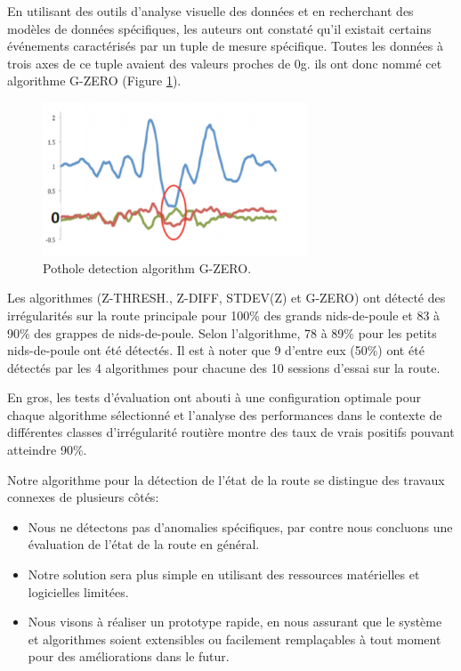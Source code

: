 En utilisant des outils d'analyse visuelle des données et en recherchant des modèles de données spécifiques, les auteurs ont constaté qu'il existait certains événements caractérisés par un tuple de mesure spécifique. Toutes les données à trois axes de ce tuple avaient des valeurs proches de 0g. ils ont donc nommé cet algorithme G-ZERO (Figure \ref{fig:graph_g_zero}).

\begin{figure}[h!]
  \center
  \includegraphics[width=0.7\textwidth]{Images/chapter2/relatedWork6.PNG}
  \caption{Pothole detection algorithm G-ZERO.}
  \label{fig:graph_g_zero}
\end{figure}

\bigbreak
Les algorithmes (Z-THRESH., Z-DIFF, STDEV(Z) et G-ZERO) ont détecté des irrégularités sur la route principale pour 100\% des grands nids-de-poule et 83 à 90\% des grappes de nids-de-poule. Selon l'algorithme, 78 à 89\% pour les petits nids-de-poule ont été détectés. Il est à noter que 9 d'entre eux (50\%) ont été détectés par les 4 algorithmes pour chacune des 10 sessions d'essai sur la route.

En gros, les tests d'évaluation ont abouti à une configuration optimale pour chaque algorithme sélectionné et l'analyse des performances dans le contexte de différentes classes d'irrégularité routière montre des taux de vrais positifs pouvant atteindre 90\%.

\bigbreak
Notre algorithme pour la détection de l'état de la route se distingue des travaux connexes de plusieurs côtés:
\begin{itemize}
  \item Nous ne détectons pas d'anomalies spécifiques, par contre nous concluons une évaluation de l'état de la route en général.
  \item Notre solution sera plus simple en utilisant des ressources matérielles et logicielles limitées.
  \item Nous visons à réaliser un prototype rapide, en nous assurant que le système et algorithmes soient extensibles ou facilement remplaçables à tout moment pour des améliorations dans le futur.
\end{itemize}

